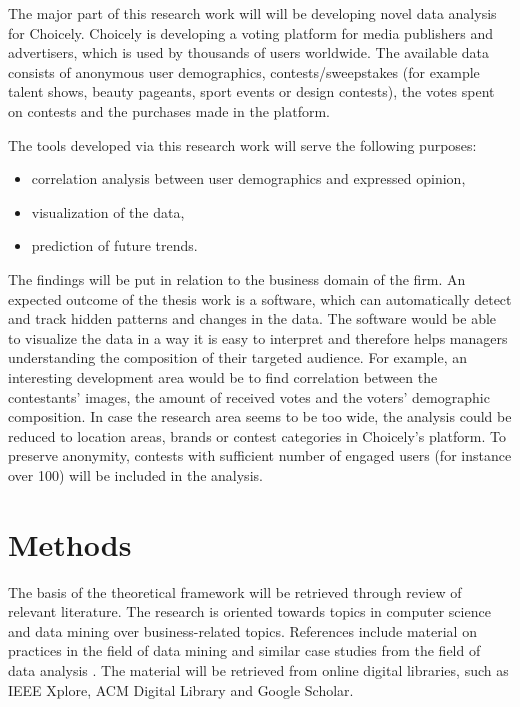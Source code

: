 \documentclass[english]{tktltiki}
\begin{document}
	The major part of this research work will will be developing novel data analysis for Choicely. Choicely is developing a voting platform for media publishers and advertisers, which is used by thousands of users worldwide. The available data consists of anonymous user demographics, contests/sweepstakes (for example talent shows, beauty pageants, sport events or design contests), the votes spent on  contests and the purchases made in the platform. 
	
	The tools developed via this research work will serve the following purposes: 
	
	\begin{itemize}
		\item correlation analysis between user demographics and expressed opinion, 
		\item visualization of the data,
		\item prediction of future trends.
	\end{itemize}
	
	The findings will be put in relation to the business domain of the firm. An expected outcome of the thesis work is a software, which can automatically detect and track hidden patterns and changes in the data. The software would be able to visualize the data in a way it is easy to interpret and therefore helps managers understanding the composition of their targeted audience. For example, an interesting development area would be to find correlation between the contestants' images, the amount of received votes and the voters' demographic composition. In case the research area seems to be too wide, the analysis could be reduced to location areas, brands or contest categories in Choicely's platform. To preserve anonymity, contests with sufficient number of engaged users (for instance over 100) will be included in the analysis. 
	
\section{Methods}
    The basis of the theoretical framework will be retrieved through review of relevant literature. The research is oriented towards topics in computer science and data mining over business-related topics. References include material on practices in the field of data mining \cite{witten2016data, introtodatamining, inmon2007tapping, bose2001business, data_mining_and_knowledge_discovery, datamininginbusinessprocesses} and similar case studies from the field of data analysis \cite{data_mining_in_educational_science, monetisingusergeneratedcontent, zarsky2002mine, saraee2004data}. The material will be retrieved from online digital libraries, such as IEEE Xplore, ACM Digital Library and Google Scholar. 
    
\end{document}
